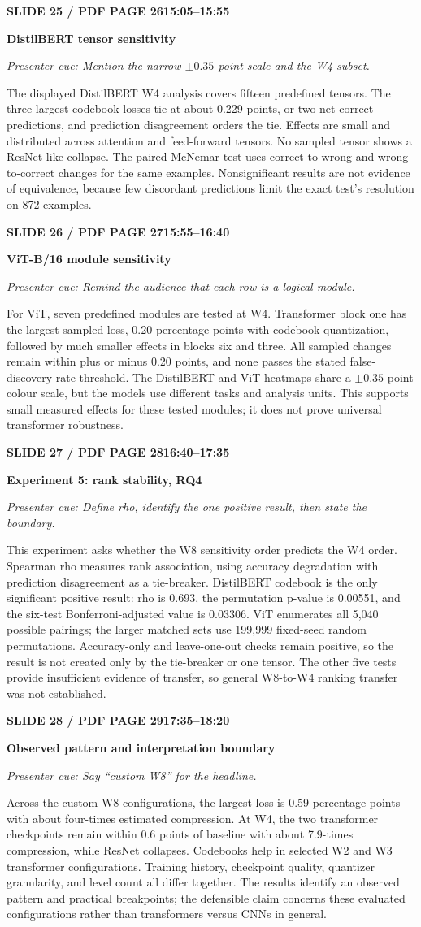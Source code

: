 \documentclass[11pt,a4paper]{article}
\newcommand{\slidetitle}[3]{%
  \vspace{2mm}\noindent
  \colorbox{TUblue}{\parbox{\dimexpr\textwidth-2\fboxsep}{\color{white}\bfseries #1\hfill #2}}%
  \par\textcolor{TUorange}{\bfseries #3}\par
}
\newcommand{\cue}[1]{\textit{\textcolor{TUblue}{Presenter cue: #1}}\par}
\newcommand{\spoken}[1]{#1\par}
\begin{document}
\slidetitle{SLIDE 25 / PDF PAGE 26}{15:05--15:55}{DistilBERT tensor sensitivity}
\cue{Mention the narrow $\pm0.35$-point scale and the W4 subset.}
\spoken{The displayed DistilBERT W4 analysis covers fifteen predefined tensors. The three largest codebook losses tie at about 0.229 points, or two net correct predictions, and prediction disagreement orders the tie. Effects are small and distributed across attention and feed-forward tensors. No sampled tensor shows a ResNet-like collapse. The paired McNemar test uses correct-to-wrong and wrong-to-correct changes for the same examples. Nonsignificant results are not evidence of equivalence, because few discordant predictions limit the exact test's resolution on 872 examples.}

\slidetitle{SLIDE 26 / PDF PAGE 27}{15:55--16:40}{ViT-B/16 module sensitivity}
\cue{Remind the audience that each row is a logical module.}
\spoken{For ViT, seven predefined modules are tested at W4. Transformer block one has the largest sampled loss, 0.20 percentage points with codebook quantization, followed by much smaller effects in blocks six and three. All sampled changes remain within plus or minus 0.20 points, and none passes the stated false-discovery-rate threshold. The DistilBERT and ViT heatmaps share a $\pm0.35$-point colour scale, but the models use different tasks and analysis units. This supports small measured effects for these tested modules; it does not prove universal transformer robustness.}

\slidetitle{SLIDE 27 / PDF PAGE 28}{16:40--17:35}{Experiment 5: rank stability, RQ4}
\cue{Define rho, identify the one positive result, then state the boundary.}
\spoken{This experiment asks whether the W8 sensitivity order predicts the W4 order. Spearman rho measures rank association, using accuracy degradation with prediction disagreement as a tie-breaker. DistilBERT codebook is the only significant positive result: rho is 0.693, the permutation p-value is 0.00551, and the six-test Bonferroni-adjusted value is 0.03306. ViT enumerates all 5,040 possible pairings; the larger matched sets use 199,999 fixed-seed random permutations. Accuracy-only and leave-one-out checks remain positive, so the result is not created only by the tie-breaker or one tensor. The other five tests provide insufficient evidence of transfer, so general W8-to-W4 ranking transfer was not established.}

\slidetitle{SLIDE 28 / PDF PAGE 29}{17:35--18:20}{Observed pattern and interpretation boundary}
\cue{Say ``custom W8'' for the headline.}
\spoken{Across the custom W8 configurations, the largest loss is 0.59 percentage points with about four-times estimated compression. At W4, the two transformer checkpoints remain within 0.6 points of baseline with about 7.9-times compression, while ResNet collapses. Codebooks help in selected W2 and W3 transformer configurations. Training history, checkpoint quality, quantizer granularity, and level count all differ together. The results identify an observed pattern and practical breakpoints; the defensible claim concerns these evaluated configurations rather than transformers versus CNNs in general.}
\end{document}
